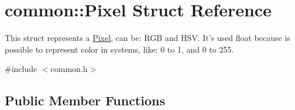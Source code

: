 \hypertarget{structcommon_1_1Pixel}{\section{common\-:\-:Pixel Struct Reference}
\label{structcommon_1_1Pixel}
}


This struct represents a \hyperlink{structcommon_1_1Pixel}{Pixel}, can be\-: R\-G\-B and H\-S\-V. It's used float because is possible to represent color in systems, like\-: 0 to 1, and 0 to 255.  




{\ttfamily \#include $<$common.\-h$>$}

\subsection*{Public Member Functions}
